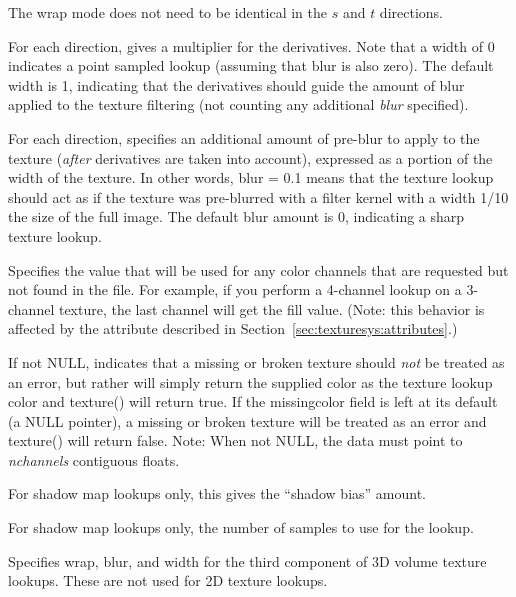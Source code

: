 The wrap mode does not need to be identical in the $s$ and $t$
directions.
\apiend

For each direction, gives a multiplier for the derivatives.  Note that
a width of 0 indicates a point sampled lookup (assuming that blur is
also zero).  The default width is 1, indicating that the derivatives
should guide the amount of blur applied to the texture filtering (not
counting any additional \emph{blur} specified).
\apiend

For each direction, specifies an additional amount of pre-blur to apply
to the texture (\emph{after} derivatives are taken into account),
expressed as a portion of the width of the texture.  In other words,
blur = 0.1 means that the texture lookup should act as if the texture
was pre-blurred with a filter kernel with a width 1/10 the size of the
full image.  The default blur amount is 0, indicating a sharp texture
lookup.
\apiend

Specifies the value that will be used for any color channels that are
requested but not found in the file.  For example, if you perform a
4-channel lookup on a 3-channel texture, the last channel will
get the fill value.  (Note: this behavior is affected by the
 attribute described in 
Section~\ref{sec:texturesys:attributes}.)
\apiend

If not NULL, indicates that a missing or broken texture should \emph{not}
be treated as an error, but rather will simply return the supplied color
as the texture lookup color and {\cf texture()} will return {\cf true}.  
If the {\cf missingcolor} field is left at its default (a NULL pointer),
a missing or broken texture will be treated as an error and
{\cf texture()} will return {\cf false}.
Note: When not NULL, the data must point to \emph{nchannels} contiguous floats.
\apiend

For shadow map lookups only, this gives the ``shadow bias'' amount.
\apiend

For shadow map lookups only, the number of samples to use for the lookup.
\apiend

Specifies wrap, blur, and width for the third component of 3D volume texture
lookups.  These are not used for 2D texture lookups.
\apiend




